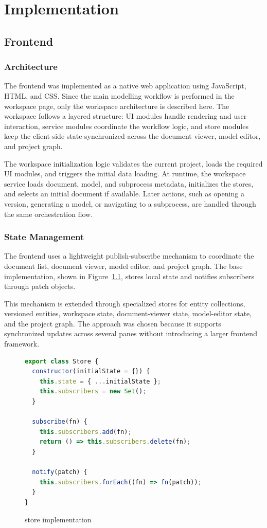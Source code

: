 \chapter{Implementation}
\label{sec:implementation}

\section{Frontend}
\subsection{Architecture}
The frontend was implemented as a native web application using JavaScript, HTML, and CSS. Since the main modelling workflow is performed in the workspace page, only the workspace architecture is described here. The workspace follows a layered structure: UI modules handle rendering and user interaction, service modules coordinate the workflow logic, and store modules keep the client-side state synchronized across the document viewer, model editor, and project graph.

The workspace initialization logic validates the current project, loads the required UI modules, and triggers the initial data loading. At runtime, the workspace service loads document, model, and subprocess metadata, initializes the stores, and selects an initial document if available. Later actions, such as opening a version, generating a model, or navigating to a subprocess, are handled through the same orchestration flow.

\subsection{State Management}
The frontend uses a lightweight publish-subscribe mechanism to coordinate the document list, document viewer, model editor, and project graph. The base implementation, shown in Figure~\ref{fig:imp_frontend_pubsub_store}, stores local state and notifies subscribers through patch objects.

This mechanism is extended through specialized stores for entity collections, versioned entities, workspace state, document-viewer state, model-editor state, and the project graph. The approach was chosen because it supports synchronized updates across several panes without introducing a larger frontend framework.

\begin{figure}[H]
  \centering
  \caption{store implementation}
  \label{fig:imp_frontend_pubsub_store}
  \begin{lstlisting}[language=JavaScript]
export class Store {
  constructor(initialState = {}) {
    this.state = { ...initialState };
    this.subscribers = new Set();
  }

  subscribe(fn) {
    this.subscribers.add(fn);
    return () => this.subscribers.delete(fn);
  }

  notify(patch) {
    this.subscribers.forEach((fn) => fn(patch));
  }
}
  \end{lstlisting}
\end{figure}

